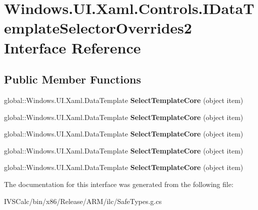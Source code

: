 \hypertarget{interface_windows_1_1_u_i_1_1_xaml_1_1_controls_1_1_i_data_template_selector_overrides2}{}\section{Windows.\+U\+I.\+Xaml.\+Controls.\+I\+Data\+Template\+Selector\+Overrides2 Interface Reference}
\label{interface_windows_1_1_u_i_1_1_xaml_1_1_controls_1_1_i_data_template_selector_overrides2}
\subsection*{Public Member Functions}
\begin{DoxyCompactItemize}
\item 
\mbox{\label{interface_windows_1_1_u_i_1_1_xaml_1_1_controls_1_1_i_data_template_selector_overrides2_af2b214a1f4d26841e6d22666f2f66763}} 
global\+::\+Windows.\+U\+I.\+Xaml.\+Data\+Template {\bfseries Select\+Template\+Core} (object item)
\item 
\mbox{\label{interface_windows_1_1_u_i_1_1_xaml_1_1_controls_1_1_i_data_template_selector_overrides2_af2b214a1f4d26841e6d22666f2f66763}} 
global\+::\+Windows.\+U\+I.\+Xaml.\+Data\+Template {\bfseries Select\+Template\+Core} (object item)
\item 
\mbox{\label{interface_windows_1_1_u_i_1_1_xaml_1_1_controls_1_1_i_data_template_selector_overrides2_af2b214a1f4d26841e6d22666f2f66763}} 
global\+::\+Windows.\+U\+I.\+Xaml.\+Data\+Template {\bfseries Select\+Template\+Core} (object item)
\item 
\mbox{\label{interface_windows_1_1_u_i_1_1_xaml_1_1_controls_1_1_i_data_template_selector_overrides2_af2b214a1f4d26841e6d22666f2f66763}} 
global\+::\+Windows.\+U\+I.\+Xaml.\+Data\+Template {\bfseries Select\+Template\+Core} (object item)
\item 
\mbox{\label{interface_windows_1_1_u_i_1_1_xaml_1_1_controls_1_1_i_data_template_selector_overrides2_af2b214a1f4d26841e6d22666f2f66763}} 
global\+::\+Windows.\+U\+I.\+Xaml.\+Data\+Template {\bfseries Select\+Template\+Core} (object item)
\end{DoxyCompactItemize}


The documentation for this interface was generated from the following file\+:\begin{DoxyCompactItemize}
\item 
I\+V\+S\+Calc/bin/x86/\+Release/\+A\+R\+M/ilc/Safe\+Types.\+g.\+cs\end{DoxyCompactItemize}
